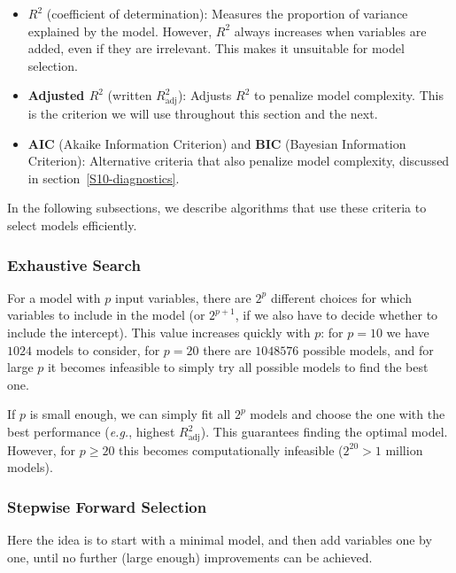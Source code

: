 \documentclass[
  a4paper,
]{article}
\theoremstyle{definition}
\theoremstyle{definition}
\theoremstyle{definition}
\theoremstyle{definition}
\theoremstyle{remark}
\begin{document}
\begin{itemize}
\item
  \textbf{\(R^2\)} (coefficient of determination): Measures the proportion of
  variance explained by the model. However, \(R^2\) always increases when
  variables are added, even if they are irrelevant. This makes it
  unsuitable for model selection.
\item
  \textbf{Adjusted \(R^2\)} (written \(R^2_\mathrm{adj}\)): Adjusts \(R^2\) to
  penalize model complexity. This is the criterion we will use
  throughout this section and the next.
\item
  \textbf{AIC} (Akaike Information Criterion) and \textbf{BIC} (Bayesian
  Information Criterion): Alternative criteria that also penalize
  model complexity, discussed in section~\ref{S10-diagnostics}.
\end{itemize}

In the following subsections, we describe algorithms that use these
criteria to select models efficiently.

\subsubsection{Exhaustive Search}\label{exhaustive-search}

For a model with \(p\) input variables, there are \(2^p\) different choices for
which variables to include in the model (or \(2^{p+1}\), if we also have to
decide whether to include the intercept). This value increases quickly with
\(p\): for \(p = 10\) we have \(1024\) models to consider, for \(p = 20\) there are
\(1048576\) possible models, and for large \(p\) it becomes infeasible to simply
try all possible models to find the best one.

If \(p\) is small enough, we can simply fit all \(2^p\) models and choose the one
with the best performance (\emph{e.g.}, highest \(R^2_\mathrm{adj}\)). This guarantees
finding the optimal model. However, for \(p \geq 20\) this becomes
computationally infeasible (\(2^{20} > 1\) million models).

\subsubsection{Stepwise Forward Selection}\label{stepwise-forward-selection}

Here the idea is to start with a minimal model, and then add variables one by
one, until no further (large enough) improvements can be achieved.
\end{document}
